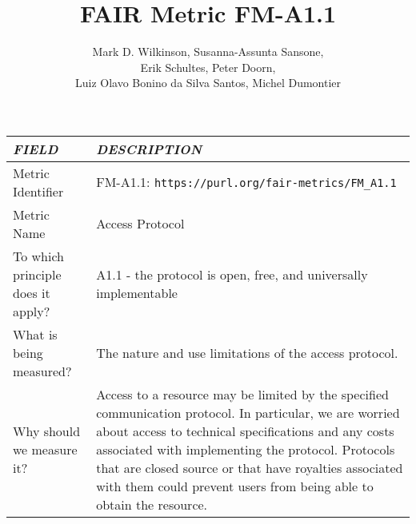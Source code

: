 \documentclass[english]{article}
\begin{document}
\title{FAIR Metric FM-A1.1}

\author{Mark D. Wilkinson, Susanna-Assunta Sansone, \\Erik Schultes, Peter Doorn,\\ 
Luiz Olavo Bonino da Silva Santos, Michel Dumontier}

\maketitle

\newpage





\begin{longtable}{|p{5cm}|p{9cm}|}


\hline
\emph{FIELD} & \emph{DESCRIPTION} \\
\hline
Metric Identifier &   FM-A1.1: \verb"https://purl.org/fair-metrics/FM_A1.1"
 \\


\hline
Metric Name &   



Access Protocol




 \\



\hline
To which principle does it apply? &   

A1.1 - the protocol is open, free, and universally implementable

\\



\hline
What is being measured? & 


The nature and use limitations of the access protocol.


\\



\hline
Why should we measure it? & 



Access to a resource may be limited by the specified communication protocol. In particular, we are worried about access to technical specifications and any costs associated with implementing the protocol. Protocols that are closed source or that have royalties associated with them could prevent users from being able to obtain the resource.
  
\\




\end{longtable}
\end{document}

